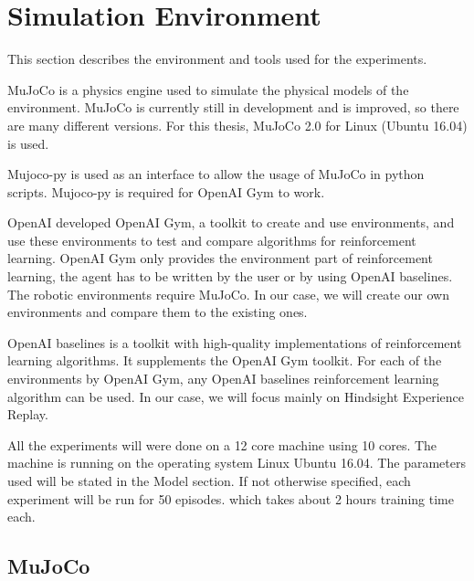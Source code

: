 \chapter{Simulation Environment}

This section describes the environment and tools used for the experiments.

MuJoCo is a physics engine used to simulate the physical models of the environment. MuJoCo is currently still in development and is improved, so there are many different versions. For this thesis, MuJoCo 2.0 for Linux (Ubuntu 16.04) is used. 

Mujoco-py is used as an interface to allow the usage of MuJoCo in python scripts. Mujoco-py is required for OpenAI Gym to work.

OpenAI developed OpenAI Gym, a toolkit to create and use environments, and use these environments to test and compare algorithms for reinforcement learning. OpenAI Gym only provides the environment part of reinforcement learning, the agent has to be written by the user or by using OpenAI baselines. The robotic environments require MuJoCo. In our case, we will create our own environments and compare them to the existing ones.

OpenAI baselines is a toolkit with high-quality implementations of reinforcement learning algorithms. It supplements the OpenAI Gym toolkit. For each of the environments by OpenAI Gym, any OpenAI baselines reinforcement learning algorithm can be used. In our case, we will focus mainly on Hindsight Experience Replay.

All the experiments will were done on a 12 core machine using 10 cores. The machine is running on the operating system Linux Ubuntu 16.04. The parameters used will be stated in the Model section. If not otherwise specified, each experiment will be run for 50 episodes. which takes about 2 hours training time each.


\section{MuJoCo}

